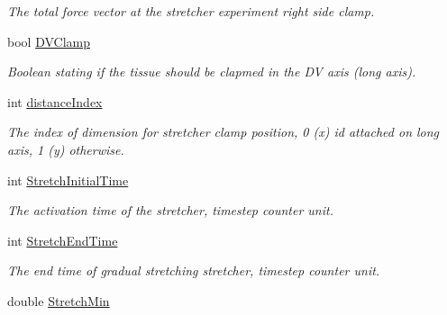 \begin{DoxyCompactItemize}
\begin{DoxyCompactList}\small\item\em The total force vector at the stretcher experiment right side clamp. \end{DoxyCompactList}\item 
\hypertarget{classSimulation_af99671c6b222e164dd65bd969632480f}{}bool \hyperlink{classSimulation_af99671c6b222e164dd65bd969632480f}{D\+V\+Clamp}\label{classSimulation_af99671c6b222e164dd65bd969632480f}

\begin{DoxyCompactList}\small\item\em Boolean stating if the tissue should be clapmed in the D\+V axis (long axis). \end{DoxyCompactList}\item 
\hypertarget{classSimulation_ac21ce1a13eb2eedd549a1f61232b948b}{}int \hyperlink{classSimulation_ac21ce1a13eb2eedd549a1f61232b948b}{distance\+Index}\label{classSimulation_ac21ce1a13eb2eedd549a1f61232b948b}

\begin{DoxyCompactList}\small\item\em The index of dimension for stretcher clamp position, 0 (x) id attached on long axis, 1 (y) otherwise. \end{DoxyCompactList}\item 
\hypertarget{classSimulation_a8b7c90b578a80c574d7f8c35adac0afd}{}int \hyperlink{classSimulation_a8b7c90b578a80c574d7f8c35adac0afd}{Stretch\+Initial\+Time}\label{classSimulation_a8b7c90b578a80c574d7f8c35adac0afd}

\begin{DoxyCompactList}\small\item\em The activation time of the stretcher, timestep counter unit. \end{DoxyCompactList}\item 
\hypertarget{classSimulation_af13e08bc4489985bbb66400226595aac}{}int \hyperlink{classSimulation_af13e08bc4489985bbb66400226595aac}{Stretch\+End\+Time}\label{classSimulation_af13e08bc4489985bbb66400226595aac}

\begin{DoxyCompactList}\small\item\em The end time of gradual stretching stretcher, timestep counter unit. \end{DoxyCompactList}\item 
\hypertarget{classSimulation_a579d17e790d3ea2e470db00e3a732e0c}{}double \hyperlink{classSimulation_a579d17e790d3ea2e470db00e3a732e0c}{Stretch\+Min}\label{classSimulation_a579d17e790d3ea2e470db00e3a732e0c}


\end{DoxyCompactItemize}
